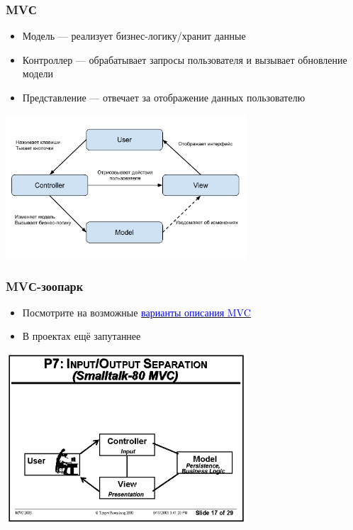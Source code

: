 \documentclass[aspectratio=169]{beamer}
\begin{document}
\begin{frame}[fragile]
  \transwipe[direction=90]
  \frametitle{MVС}
  \begin{minipage}{.4\textwidth}
    \begin{itemize}
      \item Модель --- реализует бизнес-логику/хранит данные
      \item Контроллер --- обрабатывает запросы пользователя и вызывает обновление модели
      \item Представление --- отвечает за отображение данных пользователю
    \end{itemize}
  \end{minipage}
  \begin{minipage}{.56\textwidth}
    \includegraphics[width=9cm]{pictures/MVC.pdf}
  \end{minipage}

\end{frame}

\begin{frame}[fragile]
  \transwipe[direction=90]
  \frametitle{MVС-зоопарк}
  \begin{minipage}{.4\textwidth}
    \begin{itemize}
      \item Посмотрите на возможные \href{https://www.google.com/search?q=mvc}{\textcolor{blue}{варианты описания MVC}}
      \item В проектах ещё запутаннее
    \end{itemize}
  \end{minipage}
  \begin{minipage}{.56\textwidth}
    \includegraphics[width=9cm]{pictures/MVC_original.png}
  \end{minipage}

\end{frame}
\end{document}
